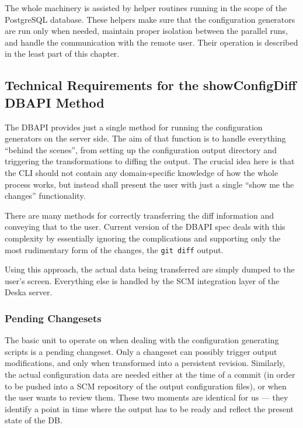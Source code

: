 \documentclass[deska]{subfiles}
\begin{document}
The whole machinery is assisted by helper routines running in the scope of the PostgreSQL database.  These helpers make
sure that the configuration generators are run only when needed, maintain proper isolation between the parallel runs,
and handle the communication with the remote user.  Their operation is described in the least part of this chapter.

\subsection{Technical Requirements for the showConfigDiff DBAPI Method}

The DBAPI provides just a single method for running the configuration generators on the server side.  The aim of that
function is to handle everything ``behind the scenes'', from setting up the configuration output directory and
triggering the transformations to diffing the output.  The crucial idea here is that the CLI should not contain any
domain-specific knowledge of how the whole process works, but instead shall present the user with just a single ``show
me the changes'' functionality.

There are many methods for correctly transferring the diff information and conveying that to the user.  Current version
of the DBAPI spec deals with this complexity by essentially ignoring the complications and supporting only the most
rudimentary form of the changes, the {\tt git diff} output.

Using this approach, the actual data being transferred are simply dumped to the user's screen.  Everything else is
handled by the SCM integration layer of the Deska server.

\subsubsection{Pending Changesets}

The basic unit to operate on when dealing with the configuration generating scripts is a pending changeset.  Only a
changeset can possibly trigger output modifications, and only when transformed into a persistent revision.  Similarly,
the actual configuration data are needed either at the time of a commit (in order to be pushed into a SCM repository of
the output configuration files), or when the user wants to review them.  These two moments are identical for us --- they
identify a point in time where the output has to be ready and reflect the present state of the DB.
\end{document}
